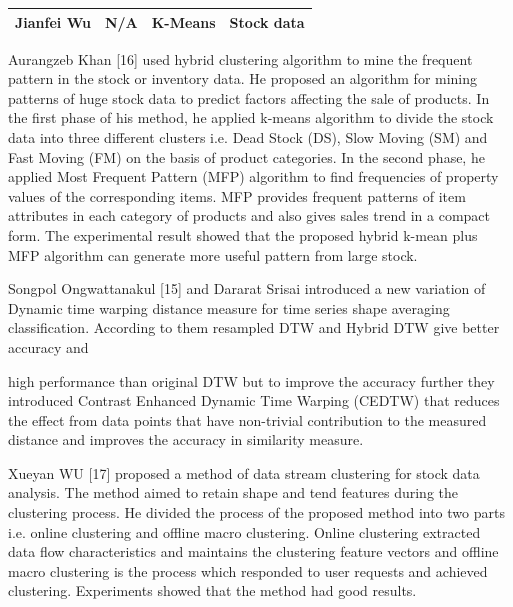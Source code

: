 \begin{table}[ht]
\begin{tabular}{|l|l|l|l|}
Jianfei Wu                                                     & N/A                                                                                                                                          & K-Means                                                                                  & Stock data                                                                                      \\ \hline
\end{tabular}
\end{table}


Aurangzeb  Khan  [16]  used  hybrid  clustering  algorithm  to mine the frequent pattern in the stock or inventory data. He proposed an algorithm for mining patterns of huge stock data to predict factors affecting the sale of products. In the first phase of his method, he applied k-means algorithm to divide the stock data into  three different clusters i.e. Dead Stock (DS), Slow Moving (SM) and Fast Moving (FM) on the basis of product categories. In the second phase, he applied Most Frequent Pattern (MFP) algorithm to find frequencies of property values  of the  corresponding items. MFP  provides frequent  patterns  of  item  attributes  in  each  category  of products and also gives sales trend in a compact form. The experimental result showed that the proposed hybrid k-mean plus MFP algorithm can generate more useful pattern from large stock.

Songpol Ongwattanakul [15] and Dararat Srisai introduced a new variation of Dynamic time warping distance measure for time series shape averaging classification. According to them resampled DTW and Hybrid DTW give better accuracy and
 
high  performance  than  original  DTW  but  to  improve  the
accuracy further they introduced Contrast Enhanced Dynamic
Time Warping (CEDTW) that reduces the effect from data points  that  have  non-trivial  contribution  to  the  measured
distance and improves the accuracy in similarity measure.

Xueyan WU [17] proposed a method of data stream clustering for stock data analysis. The method aimed to retain shape and tend features during the clustering process. He divided the process of the proposed method into two parts i.e. online clustering and offline macro clustering. Online clustering extracted   data   flow   characteristics   and   maintains   the clustering feature vectors and offline macro clustering is the process which responded to user requests and achieved clustering. Experiments showed that the method had good results.


